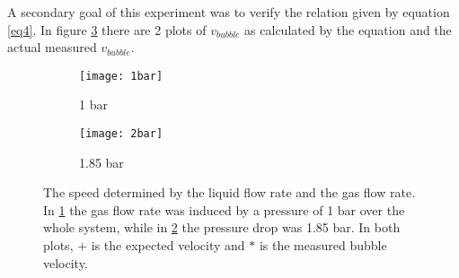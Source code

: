 A secondary goal of this experiment was to verify the relation given by equation \ref{eq4}. In figure \ref{fig:secgoal} there are 2 plots of $v_{bubble}$ as calculated by the equation and the actual measured $v_{bubble}$. 
\begin{figure}
\centering
\begin{subfigure}{0.45\textwidth}
\centering
\texttt{[image: 1bar]}
\caption{1 bar}
\label{fig:sub1}
\end{subfigure}
\begin{subfigure}{0.45\textwidth}
\centering
\texttt{[image: 2bar]}
\caption{1.85 bar}
\label{fig:sub2}
\end{subfigure}
\caption{The speed determined by the liquid flow rate and the gas flow rate. In \ref{fig:sub1} the gas flow rate was induced by a pressure of 1 bar over the whole system, while in \ref{fig:sub2} the pressure drop was 1.85 bar. In both plots, $+$ is the expected velocity and $\ast$ is the measured bubble velocity.}
\label{fig:secgoal}
\end{figure}